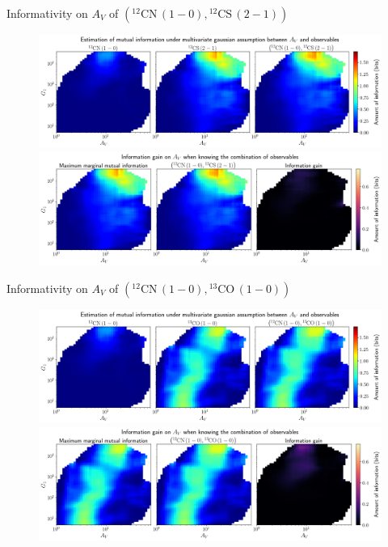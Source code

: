 \documentclass{beamer}
\begin{document}
\begin{frame}{Informativity on $A_V$ of $\left(\mathrm{^{12}CN\,(1-0)},\mathrm{^{12}CS\,(2-1)}\right)$}
    \begin{figure}
        \centering
        \includegraphics[width=0.95\linewidth]{../linearinfo/av__12cn10_12cs21_linearinfo.png}
        \vfill
        \includegraphics[width=0.95\linewidth]{../linearinfo/av__12cn10_12cs21_linearinfo_gain.png}
    \end{figure}
\end{frame}

\begin{frame}{Informativity on $A_V$ of $\left(\mathrm{^{12}CN\,(1-0)},\mathrm{^{13}CO\,(1-0)}\right)$}
    \begin{figure}
        \centering
        \includegraphics[width=0.95\linewidth]{../linearinfo/av__12cn10_13co10_linearinfo.png}
        \vfill
        \includegraphics[width=0.95\linewidth]{../linearinfo/av__12cn10_13co10_linearinfo_gain.png}
    \end{figure}
\end{frame}
\end{document}
